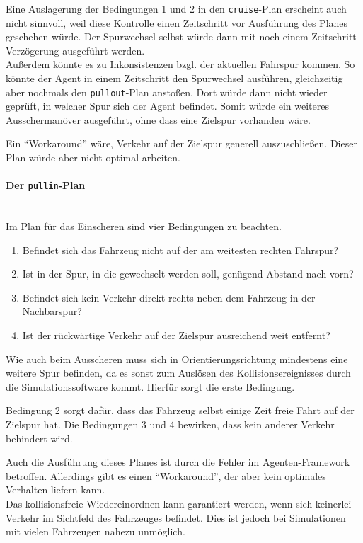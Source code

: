 Eine Auslagerung der Bedingungen 1 und 2 in den \texttt{cruise}-Plan erscheint auch nicht sinnvoll, weil diese Kontrolle einen Zeitschritt vor Ausführung des Planes geschehen würde.
Der Spurwechsel selbst würde dann mit noch einem Zeitschritt Verzögerung ausgeführt werden.
\\
Außerdem könnte es zu Inkonsistenzen bzgl. der aktuellen Fahrspur kommen.
So könnte der Agent in einem Zeitschritt den Spurwechsel ausführen, gleichzeitig aber nochmals den \texttt{pullout}-Plan anstoßen.
Dort würde dann nicht wieder geprüft, in welcher Spur sich der Agent befindet.
Somit würde ein weiteres Ausschermanöver ausgeführt, ohne dass eine Zielspur vorhanden wäre.

Ein \enquote{Workaround} wäre, Verkehr auf der Zielspur generell auszuschließen.
Dieser Plan würde aber nicht optimal arbeiten. 



\paragraph*{Der \texttt{pullin}-Plan} 
\hfill \\
Im Plan für das Einscheren sind vier Bedingungen zu beachten.

\begin{enumerate}
	\itemsep0em
	\item Befindet sich das Fahrzeug nicht auf der am weitesten rechten Fahrspur?
	\item Ist in der Spur, in die gewechselt werden soll, genügend Abstand nach vorn?
	\item Befindet sich kein Verkehr direkt rechts neben dem Fahrzeug in der Nachbarspur?
	\item Ist der rückwärtige Verkehr auf der Zielspur ausreichend weit entfernt?
\end{enumerate}

Wie auch beim Ausscheren muss sich in Orientierungsrichtung mindestens eine weitere Spur befinden, da es sonst zum Auslösen des Kollisionsereignisses durch die Simulationssoftware kommt.
Hierfür sorgt die erste Bedingung.

Bedingung 2 sorgt dafür, dass das Fahrzeug selbst einige Zeit freie Fahrt auf der Zielspur hat.
Die Bedingungen 3 und 4 bewirken, dass kein anderer Verkehr behindert wird. 

Auch die Ausführung dieses Planes ist durch die Fehler im Agenten-Framework betroffen. Allerdings gibt es einen \enquote{Workaround}, der aber kein optimales Verhalten liefern kann.
\\
Das kollisionsfreie Wiedereinordnen kann garantiert werden, wenn sich keinerlei Verkehr im Sichtfeld des Fahrzeuges befindet.
Dies ist jedoch bei Simulationen mit vielen Fahrzeugen nahezu unmöglich.



